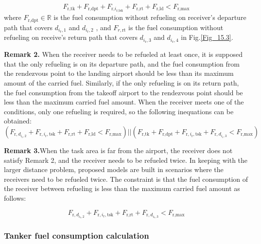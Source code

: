 \begin{equation}
F_{\text{r,tk}}+F_{\text{r,dpt}}+F_{\text{r,}i_{\text{r,tsk}}}+F_{\text{r,rt}}+F_{\text{r,ld}}<F_{\text{r,max}}
\label{eq:15.19}
\end{equation}
where $F_{\text{r,dpt}}\in\mathbb{R}$  is the fuel consumption without refueling on receiver's departure path that covers $d_{i_\text{r},1}$  and $d_{i_\text{r},2}$ , and $F_{r,\text{rt}}$  is the fuel consumption without refueling on receive's return path that covers $d_{i_\text{r},3}$  and $d_{i_\text{r},4}$  in Fig.\ref{Fig_15.3}.

\textbf{Remark 2.} When the receiver needs to be refueled at least once, it is supposed that the only refueling is on its departure path, and the fuel consumption from the rendezvous point to the landing airport should be less than its maximum amount of the carried fuel. Similarly, if the only refueling is on its return path, the fuel consumption from the takeoff airport to the rendezvous point should be less than the maximum carried fuel amount. When the receiver meets one of the conditions, only one refueling is required, so the following inequations can be obtained:
\begin{equation}
\left(F_{\text{r},d_{i_{\text{r}},2}}+F_{\text{r},i_{\text{r}},\text{tsk}}+F_{\text{r},\text{rt}}+F_{\text{r},\text{ld}}<F_{\text{r},\text{max}}\right)||\left(F_{\text{r},\text{tk}}+F_{\text{r},\text{dpt}}+F_{\text{r},i_{\text{r}},\text{tsk}}+F_{\text{r},d_{i_{\text{r}},3}}<F_{\text{r},\text{max}}\right)
\label{eq:15.20}
\end{equation}

\textbf{Remark 3.}When the task area is far from the airport, the receiver does not satisfy Remark 2, and the receiver needs to be refueled twice. In keeping with the larger distance problem, proposed models are built in scenarios where the receivers need to be refueled twice. The constraint is that the fuel consumption of the receiver between refueling is less than the maximum carried fuel amount as follows:

\begin{equation}
F_{\text{r},d_{i_{\text{r}},2}}+F_{\text{r},i_{\text{r}},\text{tsk}}+F_{\text{r},\text{rt}}+F_{\text{r},d_{i_{\text{r}},3}}<F_{\text{r},\text{max}}
\label{eq:15.21}
\end{equation}

\subsubsection{Tanker fuel consumption calculation}

